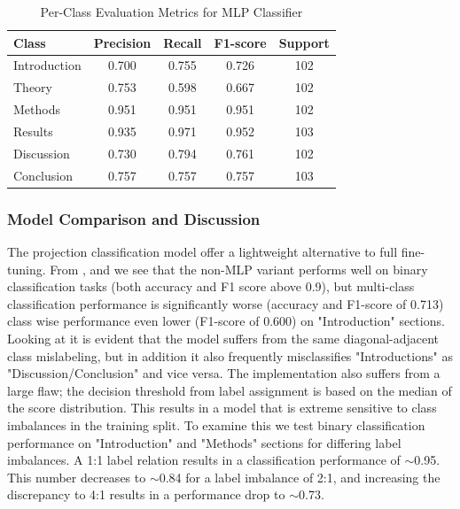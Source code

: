 \begin{table}[ht]
\centering
\caption{Per-Class Evaluation Metrics for MLP Classifier}
\begin{tabular}{lcccc}
\toprule
\textbf{Class} & \textbf{Precision} & \textbf{Recall} & \textbf{F1-score} & \textbf{Support} \\
\midrule
Introduction & 0.700 & 0.755 & 0.726 & 102 \\
Theory & 0.753 & 0.598 & 0.667 & 102 \\
Methods & 0.951 & 0.951 & 0.951 & 102 \\
Results & 0.935 & 0.971 & 0.952 & 103 \\
Discussion & 0.730 & 0.794 & 0.761 & 102 \\
Conclusion & 0.757 & 0.757 & 0.757 & 103 \\
\bottomrule
\end{tabular}
\label{tab:110}
\end{table}


\subsubsection{Model Comparison and Discussion}
The projection classification model offer a lightweight alternative to full fine-tuning. From ,  and  we see that the non-MLP variant performs well on binary classification tasks (both accuracy and F1 score above 0.9), but multi-class classification performance is significantly worse (accuracy and F1-score of 0.713) class wise performance even lower (F1-score of 0.600) on "Introduction" sections. Looking at  it is evident that the model suffers from the same diagonal-adjacent class mislabeling, but in addition it also frequently misclassifies "Introductions" as "Discussion/Conclusion" and vice versa. The implementation also suffers from a large flaw; the decision threshold from label assignment is based on the median of the score distribution. This results in a model that is extreme sensitive to class imbalances in the training split. To examine this we test binary classification performance on "Introduction" and "Methods" sections for differing label imbalances. A 1:1 label relation results in a classification performance of $\sim$0.95. This number decreases to $\sim$0.84 for a label imbalance of 2:1, and increasing the discrepancy to 4:1 results in a performance drop to $\sim$0.73.


